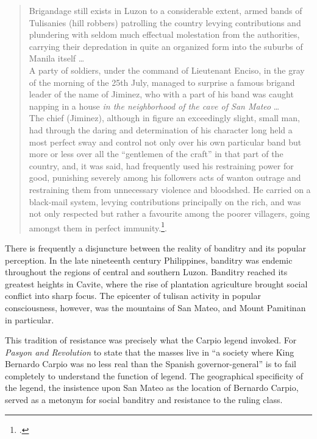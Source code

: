 \begin{quote}
Brigandage still exists in Luzon to a considerable extent, armed bands of Tulisanies  (hill robbers) patrolling the country levying contributions and plundering with seldom much effectual molestation from the authorities, carrying their depredation in quite an organized form into the suburbs of Manila itself \ldots\ \\
A party of soldiers, under the command of Lieutenant Enciso, in the gray of the morning of the 25th July, managed to surprise a famous brigand leader of the name of Jiminez, who with a part of his band was caught napping in a house \textit{in the neighborhood of the cave of San Mateo} \ldots\ \\
The chief (Jiminez), although in figure an exceedingly slight, small man, had through the daring and determination of his character long held a most perfect sway and control not only over his own particular band but more or less over all the \enquote{gentlemen of the craft} in that part of the country, and, it was said, had frequently used his restraining power for good, punishing severely among his followers acts of wanton outrage and restraining them from unnecessary violence and bloodshed. He carried on a black-mail system, levying contributions principally on the rich, and was not only respected but rather a favourite among the poorer villagers, going amongst them in perfect immunity.\footcite[170-3, emphasis added]{Ellis1859}.
\end{quote}

There is frequently a disjuncture between the reality of banditry and its popular perception. In the late nineteenth century Philippines, banditry was endemic throughout the regions of central and southern Luzon.  Banditry reached its greatest heights in Cavite, where the rise of plantation agriculture brought social conflict into sharp focus. The epicenter of tulisan activity in popular consciousness, however, was the mountains of San Mateo, and Mount Pamitinan in particular.

This tradition of resistance was precisely what the Carpio legend invoked. For \textit{Pasyon and Revolution} to state that the masses live in \enquote{a society where King Bernardo Carpio was no less real than the Spanish governor-general} is to fail completely to understand the function of legend. The geographical specificity of the legend, the insistence upon San Mateo as the location of Bernardo Carpio, served as a metonym for social banditry and resistance to the ruling class.

